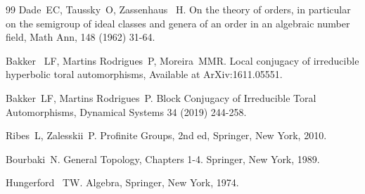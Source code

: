 \documentclass{amsart}
\theoremstyle{plain}
\theoremstyle{definition}
\theoremstyle{remark}
\begin{document}
\begin{thebibliography}{99}
Dade~EC, Taussky~O, Zassenhaus~ H. On the theory of orders, in particular on the semigroup of ideal classes and genera of an order in an algebraic number field, Math Ann, 148 (1962) 31-64.

Bakker~ LF, Martins Rodrigues~P, Moreira~MMR. Local conjugacy of irreducible hyperbolic toral automorphisms, Available at ArXiv:1611.05551.

Bakker~LF, Martins Rodrigues~P. Block Conjugacy of Irreducible Toral Automorphisms, Dynamical Systems 34 (2019) 244-258.

Ribes~L, Zalesskii~P. Profinite Groups, 2nd ed, Springer, New York, 2010.

Bourbaki~N. General Topology, Chapters 1-4. Springer, New York, 1989.

Hungerford~ TW. Algebra, Springer, New York, 1974.

\end{thebibliography}
\end{document}
